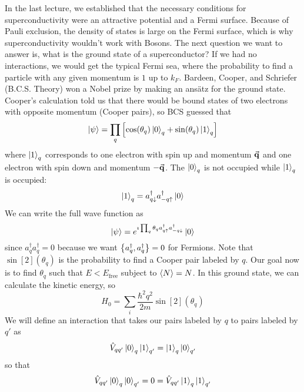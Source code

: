 \documentclass[a4paper,twoside,master.tex]{subfiles}
\begin{document}
In the last lecture, we established that the necessary conditions for superconductivity were an attractive potential and a Fermi surface. Because of Pauli exclusion, the density of states is large on the Fermi surface, which is why superconductivity wouldn't work with Bosons. The next question we want to answer is, what is the ground state of a superconductor? If we had no interactions, we would get the typical Fermi sea, where the probability to find a particle with any given momentum is $ 1 $ up to $ k_F $. Bardeen, Cooper, and Schriefer (B.C.S. Theory) won a Nobel prize by making an ans\"atz for the ground state. Cooper's calculation told us that there would be bound states of two electrons with opposite momentum (Cooper pairs), so BCS guessed that
\begin{equation}
    \ket{\psi} = \prod_{q} \left[ \cos(\theta_q)\ket{0}_q + \sin(\theta_q)\ket{1}_q \right]
\end{equation}
where $\ket{1}_q $ corresponds to one electron with spin up and momentum $ \va{q} $ and one electron with spin down and momentum $ - \va{q} $. The $\ket{0}_q $ is not occupied while $\ket{1}_q $ is occupied:
\begin{equation}
    \ket{1}_q = a^\dagger_{q\downarrow} a^\dagger_{-q\uparrow}\ket{0}
\end{equation}
We can write the full wave function as
\begin{equation}
    \ket{\psi} = e^{\imath \prod_{q} \theta_q a^\dagger_{q\uparrow} a^\dagger_{-q\downarrow}}\ket{0}
\end{equation}
since $ a_q^\dagger a_q^\dagger = 0 $ because we want $ \pb{a^\dagger_q}{a^\dagger_q} = 0 $ for Fermions. Note that $ \sin[2](\theta_q) $ is the probability to find a Cooper pair labeled by $ q $. Our goal now is to find $ \theta_q $ such that $ E < E_{\text{free}} $ subject to $ \ev{N} = N $. In this ground state, we can calculate the kinetic energy, so
\begin{equation}
    H_0 = \sum_i \frac{\hbar^2 q^2}{2m} \sin[2](\theta_q)
\end{equation}
We will define an interaction that takes our pairs labeled by $ q $ to pairs labeled by $ q' $ as
\begin{equation}
    \hat{V}_{qq'}\ket{0}_q\ket{1}_{q'} =\ket{1}_q\ket{0}_{q'}
\end{equation}
so that
\begin{equation}
    \hat{V}_{qq'}\ket{0}_q\ket{0}_{q'} = 0 = \hat{V}_{qq'}\ket{1}_q\ket{1}_{q'}
\end{equation}
\end{document}
